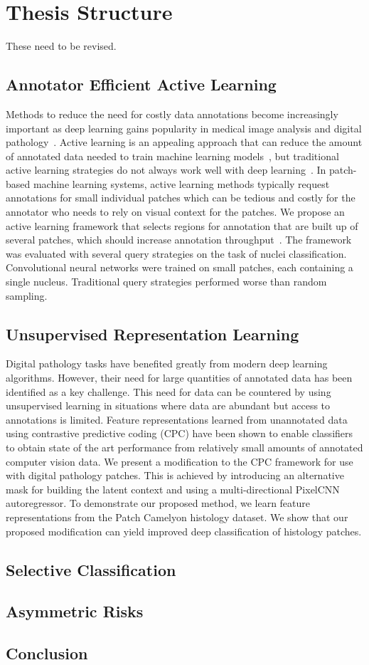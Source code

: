 \section{Thesis Structure}
\label{sec:thesis_structure}
These need to be revised.

\subsection*{Annotator Efficient Active Learning}
Methods to reduce the need for costly data annotations become increasingly important as deep learning gains popularity in medical image analysis and digital pathology~\citep{tizhoosh2018artificial}. Active learning is an appealing approach that can reduce the amount of annotated data needed to train machine learning models~\citep{settles2012active}, but traditional active learning strategies do not always work well with deep learning~\citep{wang2016cost}. In patch-based machine learning systems, active learning methods typically request annotations for small individual patches which can be tedious and costly for the annotator who needs to rely on visual context for the patches. We propose an active learning framework that selects regions for annotation that are built up of several patches, which should increase annotation throughput~\citep{carse2019active}. The framework was evaluated with several query strategies on the task of nuclei classification. Convolutional neural networks were trained on small patches, each containing a single nucleus. Traditional query strategies performed worse than random sampling.

\subsection*{Unsupervised Representation Learning}
Digital pathology tasks have benefited greatly from modern deep learning algorithms. However, their need for large quantities of annotated data has been identified as a key challenge. This need for data can be countered by using unsupervised learning in situations where data are abundant but access to annotations is limited. Feature representations learned from unannotated data using contrastive predictive coding (CPC) have been shown to enable classifiers to obtain state of the art performance from relatively small amounts of annotated computer vision data. We present a modification to the CPC framework for use with digital pathology patches. This is achieved by introducing an alternative mask for building the latent context and using a multi-directional PixelCNN autoregressor. To demonstrate our proposed method, we learn feature representations from the Patch Camelyon histology dataset. We show that our proposed modification can yield improved deep classification of histology patches.

\subsection*{Selective Classification}

\subsection*{Asymmetric Risks}

\subsection*{Conclusion}
